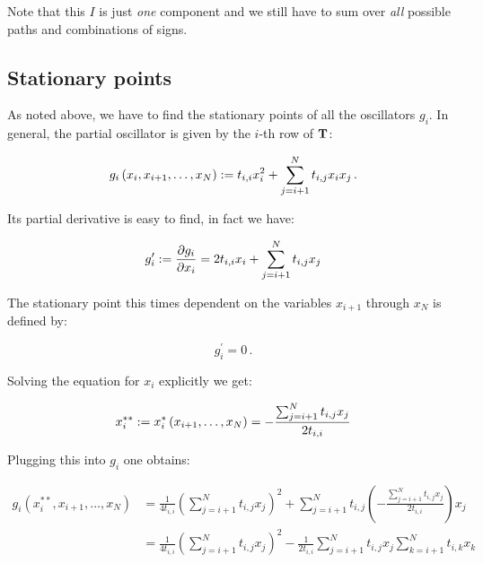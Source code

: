 \documentclass[a4paper,10pt]{article}
\begin{document}
Note that this $I$ is just \emph{one} component and we still have to sum
over \emph{all} possible paths and combinations of signs.


\subsection{Stationary points}

As noted above, we have to find the stationary points of
all the oscillators $g_i$. In general, the partial oscillator
is given by the $i$-th row of $\mathbf{T}$:

\begin{equation} \label{eq:general_partial_g}
  g_i\left(x_i, x_{i+1}, \ldots, x_N\right)
  := t_{i,i} x_i^2 + \sum_{j=i+1}^{N} t_{i,j} x_i x_j \,.
\end{equation}

Its partial derivative is easy to find, in fact we have:

\begin{equation}
 g_i^{\prime} := \frac{\partial g_i}{\partial x_i}
              = 2 t_{i,i} x_i + \sum_{j=i+1}^{N} t_{i,j} x_j
\end{equation}

The stationary point this times dependent on the variables
$x_{i+1}$ through $x_N$ is defined by:

\begin{equation}
  g_i^{\prime} = 0 \,.
\end{equation}

Solving the equation for $x_i$ explicitly we get:

\begin{equation} \label{eq:stationary_point}
 x_i^{**}
 := x_i^{*}\left(x_{i+1}, \ldots, x_N\right)
 = - \frac{ \sum_{j=i+1}^{N} t_{i,j} x_j }{ 2 t_{i,i} }
\end{equation}

Plugging this into $g_i$ one obtains:

\begin{equation}
\begin{split}
  g_i(x_i^{**}, x_{i+1}, \ldots, x_N)
  & =
  \frac{1}{4 t_{i,i}}
  \left( \sum_{j=i+1}^{N} t_{i,j} x_j \right)^2
  + \sum_{j=i+1}^{N} t_{i,j} \left(- \frac{ \sum_{j=i+1}^{N} t_{i,j} x_j }{ 2 t_{i,i} } \right) x_j \\
  & =
  \frac{1}{4 t_{i,i}}
  \left( \sum_{j=i+1}^{N} t_{i,j} x_j \right)^2
  - \frac{1}{2 t_{i,i}} \sum_{j=i+1}^{N} t_{i,j} x_j  \sum_{k=i+1}^{N} t_{i,k} x_k
\end{split}
\end{equation}
\end{document}
